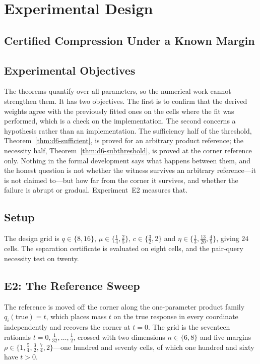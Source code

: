 \section{Experimental Design}

\subsection{Certified Compression Under a Known Margin}
\label{sec:d6-expdesign}

\subsection{Experimental Objectives}

The theorems quantify over all parameters, so the numerical work cannot strengthen them. It
has two objectives. The first is to confirm that the derived weights agree with the previously
fitted ones on the cells where the fit was performed, which is a check on the implementation.
The second concerns a hypothesis rather than an implementation. The sufficiency half of the
threshold, Theorem~\ref{thm:d6-sufficient}, is proved for an arbitrary product reference; the
necessity half, Theorem~\ref{thm:d6-subthreshold}, is proved at the corner reference only.
Nothing in the formal development says what happens between them, and the honest question is
not whether the witness survives an arbitrary reference---it is not claimed to---but how far
from the corner it survives, and whether the failure is abrupt or gradual. Experiment~E2
measures that.

\subsection{Setup}

The design grid is $q\in\{8,16\}$, $\mu\in\{\tfrac14,\tfrac25\}$, $c\in\{\tfrac32,2\}$ and
$\eta\in\{\tfrac13,\tfrac{13}{20},\tfrac45\}$, giving $24$ cells. The separation certificate
is evaluated on eight cells, and the pair-query necessity test on twenty.

\subsection{E2: The Reference Sweep}
\label{sec:d6-e2}

The reference is moved off the corner along the one-parameter product family
$q_{i}(\mathrm{true})=t$, which places mass $t$ on the true response in every coordinate
independently and recovers the corner at $t=0$. The grid is the seventeen rationals
$t=0,\tfrac1{32},\dots,\tfrac12$, crossed with two dimensions $n\in\{6,8\}$ and five margins
$\rho\in\{1,\tfrac54,\tfrac32,\tfrac74,2\}$---one hundred and seventy cells, of which one
hundred and sixty have $t>0$.

